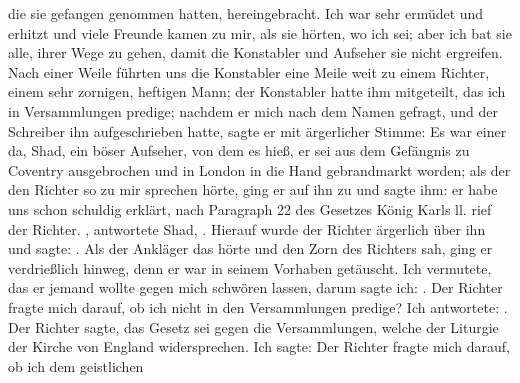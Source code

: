 die sie gefangen genommen hatten, hereingebracht. Ich war sehr
ermüdet und erhitzt und viele Freunde kamen zu mir, als sie
hörten, wo ich sei; aber ich bat sie alle, ihrer Wege zu gehen,
damit die Konstabler und Aufseher sie nicht ergreifen. Nach einer
Weile führten uns die Konstabler eine Meile weit zu einem Richter,
einem sehr zornigen, heftigen Mann; der Konstabler hatte ihm mitgeteilt, 
das ich in Versammlungen predige; nachdem er mich nach dem
Namen gefragt, und der Schreiber ihn aufgeschrieben hatte, sagte er
mit ärgerlicher Stimme: 
Es war einer da, Shad, ein böser Aufseher, von dem es hieß,
er sei aus dem Gefängnis zu Coventry 
ausgebrochen und in
London in die Hand gebrandmarkt worden; als der den Richter
so zu mir sprechen hörte, ging er auf ihn zu und sagte ihm: er
habe uns schon schuldig erklärt, nach Paragraph 22 des Gesetzes
König Karls ll.  rief der
Richter. , antwortete Shad, . Hierauf wurde
der Richter ärgerlich über ihn und sagte: .
Als der Ankläger das hörte und den Zorn des Richters sah,
ging er verdrießlich hinweg, denn er war in seinem Vorhaben
getäuscht. Ich vermutete, das er jemand wollte gegen mich
schwören lassen, darum sagte ich: . Der Richter
fragte mich darauf, ob ich nicht in den Versammlungen predige?
Ich antwortete: . Der Richter sagte, das Gesetz sei gegen die Versammlungen, 
welche der Liturgie der Kirche von England widersprechen.
Ich sagte:  Der Richter fragte mich darauf, ob ich dem geistlichen 
